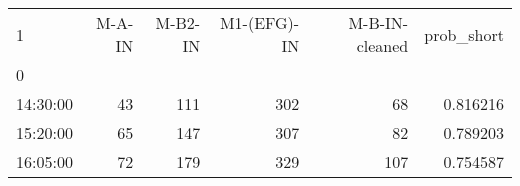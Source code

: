 \begin{tabular}{lrrrrr}
\toprule
1 &   M-A-IN &   M-B2-IN &   M1-(EFG)-IN &   M-B-IN-cleaned &  prob\_short \\
0         &          &           &               &                  &             \\
\midrule
14:30:00  &       43 &       111 &           302 &               68 &    0.816216 \\
15:20:00  &       65 &       147 &           307 &               82 &    0.789203 \\
16:05:00  &       72 &       179 &           329 &              107 &    0.754587 \\
\bottomrule
\end{tabular}
